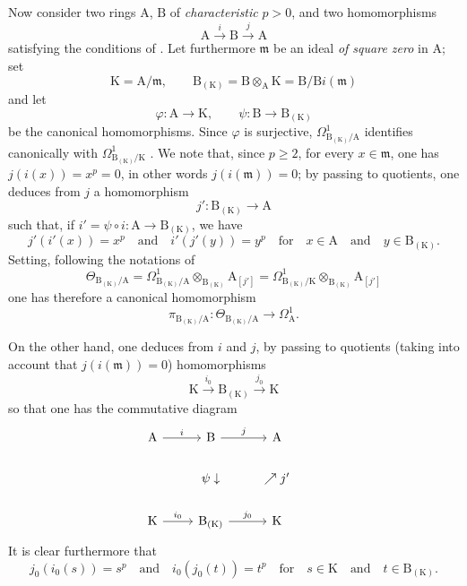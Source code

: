 \begin{env}[22.4.5]
\label{0.22.4.5}
Now consider two rings $\mathrm{A}$, $\mathrm{B}$ of \emph{characteristic} $p>0$, and two homomorphisms
\[
  \mathrm{A}\xrightarrow{i}\mathrm{B}\xrightarrow{j}\mathrm{A}
\]
satisfying the conditions of .
Let furthermore $\mathfrak{m}$ be an ideal \emph{of square zero} in $\mathrm{A}$; set
\[
  \mathrm{K}=\mathrm{A}/\mathfrak{m},\qquad \mathrm{B}_{(\mathrm{K})}=\mathrm{B}\otimes_\mathrm{A}\mathrm{K}=\mathrm{B}/\mathrm{B}i(\mathfrak{m})
\]
and let
\[
  \varphi:\mathrm{A}\to\mathrm{K},\qquad \psi:\mathrm{B}\to\mathrm{B}_{(\mathrm{K})}
\]
be the canonical homomorphisms.
Since $\varphi$ is surjective, $\Omega^1_{\mathrm{B}_{(\mathrm{K})}/\mathrm{A}}$ identifies canonically with $\Omega^1_{\mathrm{B}_{(\mathrm{K})}/\mathrm{K}}$ .
We note that, since $p\geq 2$, for every $x\in\mathfrak{m}$, one has $j(i(x))=x^p=0$, in other words $j(i(\mathfrak{m}))=0$; by passing to quotients, one deduces from $j$ a homomorphism
\[
  j':\mathrm{B}_{(\mathrm{K})}\to\mathrm{A}
\]
such that, if $i'=\psi\circ i:\mathrm{A}\to\mathrm{B}_{(\mathrm{K})}$, we have
\[
  j'(i'(x))=x^p \quad\text{and}\quad i'(j'(y))=y^p
  \quad\text{for}\quad x\in\mathrm{A}\quad\text{and}\quad y\in\mathrm{B}_{(\mathrm{K})}.
\]
Setting, following the notations of 
\[
  \Theta_{\mathrm{B}_{(\mathrm{K})}/\mathrm{A}}=\Omega^1_{\mathrm{B}_{(\mathrm{K})}/\mathrm{A}}\otimes_{\mathrm{B}_{(\mathrm{K})}}\mathrm{A}_{[j']}=\Omega^1_{\mathrm{B}_{(\mathrm{K})}/\mathrm{K}}\otimes_{\mathrm{B}_{(\mathrm{K})}}\mathrm{A}_{[j']}
\]
one has therefore  a canonical homomorphism
\[
\label{0.22.4.5.1}
  \pi_{\mathrm{B}_{(\mathrm{K})}/\mathrm{A}}:\Theta_{\mathrm{B}_{(\mathrm{K})}/\mathrm{A}}\to\Omega^1_\mathrm{A}.
  \tag{22.4.5.1}
\]

On the other hand, one deduces from $i$ and $j$, by passing to quotients (taking into account that $j(i(\mathfrak{m}))=0$) homomorphisms
\[
  \mathrm{K}\xrightarrow{i_0}\mathrm{B}_{(\mathrm{K})}\xrightarrow{j_0}\mathrm{K}
\]
so that one has the commutative diagram
\[
  \begin{tikzcd}
    \mathrm{A} \ar[r,"i"] & \mathrm{B} \ar[r,"j"] & \mathrm{A}\\
    & \psi\downarrow & \nearrow j' &\\
    \mathrm{K} \ar[r,"i_0"] & \mathrm{B}_{(\mathrm{K})} \ar[r,"j_0"] & \mathrm{K}
  \end{tikzcd}
\]
It is clear furthermore that
\[
  j_0(i_0(s))=s^p \quad\text{and}\quad i_0(j_0(t))=t^p
  \quad\text{for}\quad s\in\mathrm{K}\quad\text{and}\quad t\in\mathrm{B}_{(\mathrm{K})}.
\]


\end{env}
